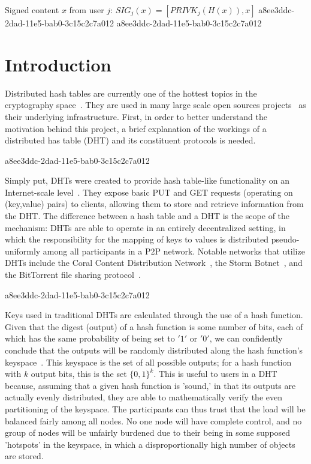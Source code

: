 \documentclass[12pt]{article}
\begin{document}
Signed content $x$ from user $j$: $SIG_j(x) = \left[ PRIVK_j( H(x) ), x \right]$
a8ee3ddc-2dad-11e5-bab0-3c15c2c7a012
a8ee3ddc-2dad-11e5-bab0-3c15c2c7a012\section{Introduction}
\par Distributed hash tables are currently one of the hottest topics in the cryptography space~\cite{Stoica:2001dj,Rowstron:2001ea,Ratnasamy:2001wn}. They are used in many large scale open sources projects~\cite{Freitas:2013tb,Xu:2010vs,Perfitt:2010fh} as their underlying infrastructure. First, in order to better understand the motivation behind this project, a brief explanation of the workings of a distributed has table (DHT) and its constituent protocols is needed.

a8ee3ddc-2dad-11e5-bab0-3c15c2c7a012\par Simply put, DHTs were created to provide hash table-like functionality on an Internet-scale level~\cite{Ratnasamy:2001wn}. They expose basic PUT and GET requests (operating on (key,value) pairs) to clients, allowing them to store and retrieve information from the DHT. The difference between a hash table and a DHT is the scope of the mechanism: DHTs are able to operate in an entirely decentralized setting, in which the responsibility for the mapping of keys to values is distributed pseudo-uniformly among all participants in a P2P network. Notable networks that utilize DHTs include the Coral Content Distribution Network~\cite{Freedman:2004vb}, the Storm Botnet~\cite{Holz:2008uk}, and the BitTorrent file sharing protocol~\cite{Cohen:y1_8mBnw}.

a8ee3ddc-2dad-11e5-bab0-3c15c2c7a012\par Keys used in traditional DHTs are calculated through the use of a hash function. Given that the digest (output) of a hash function is some number of bits, each of which has the same probability of being set to $'1'$ or $'0'$, we can confidently conclude that the outputs will be randomly distributed along the hash function's keyspace~. This keyspace is the set of all possible outputs; for a hash function with $k$ output bits, this is the set $\{0,1\}^k$. This is useful to users in a DHT because, assuming that a given hash function is 'sound,' in that its outputs are actually evenly distributed, they are able to mathematically verify the even partitioning of the keyspace. The participants can thus trust that the load will be balanced fairly among all nodes. No one node will have complete control, and no group of nodes will be unfairly burdened due to their being in some supposed 'hotspots' in the keyspace, in which a disproportionally high number of objects are stored.~
\end{document}
